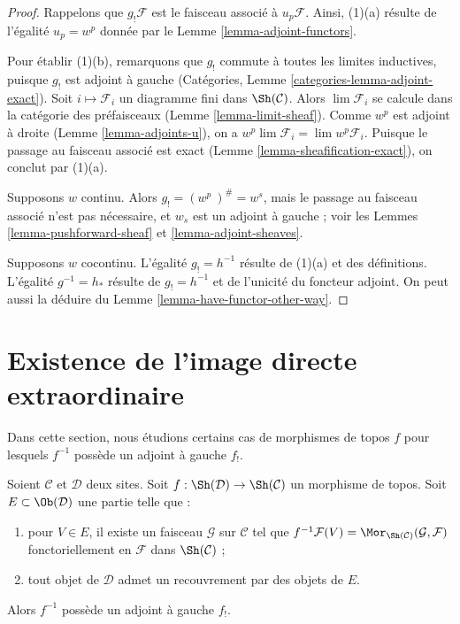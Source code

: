 \begin{proof}
Rappelons que $g_!\mathcal{F}$ est le faisceau associé à $u_p\mathcal{F}$.
Ainsi, (1)(a) résulte de l’égalité $u_p = w^p$ donnée par le
Lemme \ref{lemma-adjoint-functors}.

\medskip\noindent
Pour établir (1)(b), remarquons que $g_!$ commute à toutes les limites
inductives, puisque $g_!$ est adjoint à gauche (Catégories, Lemme
\ref{categories-lemma-adjoint-exact}).
Soit $i \mapsto \mathcal{F}_i$ un diagramme fini dans $\Sh(\mathcal{C})$.
Alors $\lim \mathcal{F}_i$ se calcule dans la catégorie des préfaisceaux
(Lemme \ref{lemma-limit-sheaf}). Comme $w^p$ est adjoint à droite
(Lemme \ref{lemma-adjoints-u}), on a
$w^p \lim \mathcal{F}_i = \lim w^p\mathcal{F}_i$.
Puisque le passage au faisceau associé est exact
(Lemme \ref{lemma-sheafification-exact}), on conclut par (1)(a).

\medskip\noindent
Supposons $w$ continu. Alors $g_! = (w^p\ )^\# = w^s$, mais le passage
au faisceau associé n’est pas nécessaire, et $w_s$ est un adjoint à gauche ;
voir les Lemmes \ref{lemma-pushforward-sheaf} et
\ref{lemma-adjoint-sheaves}.

\medskip\noindent
Supposons $w$ cocontinu. L’égalité $g_! = h^{-1}$ résulte de (1)(a)
et des définitions. L’égalité $g^{-1} = h_*$ résulte de
$g_! = h^{-1}$ et de l’unicité du foncteur adjoint.
On peut aussi la déduire du Lemme \ref{lemma-have-functor-other-way}.
\end{proof}









\section{Existence de l’image directe extraordinaire}
\label{section-lower-shriek}

\noindent
Dans cette section, nous étudions certains cas de morphismes de topos $f$
pour lesquels $f^{-1}$ possède un adjoint à gauche $f_!$.

\begin{lemma}
\label{lemma-existence-lower-shriek}
Soient $\mathcal{C}$ et $\mathcal{D}$ deux sites.
Soit $f : \Sh(\mathcal{D}) \to \Sh(\mathcal{C})$ un morphisme de topos.
Soit $E \subset \Ob(\mathcal{D})$ une partie telle que :
\begin{enumerate}
\item pour $V \in E$, il existe un faisceau $\mathcal{G}$ sur
$\mathcal{C}$ tel que $f^{-1}\mathcal{F}(V) =
\Mor_{\Sh(\mathcal{C})}(\mathcal{G}, \mathcal{F})$ fonctoriellement
en $\mathcal{F}$ dans $\Sh(\mathcal{C})$ ;
\item tout objet de $\mathcal{D}$ admet un recouvrement par des objets de $E$.
\end{enumerate}
Alors $f^{-1}$ possède un adjoint à gauche $f_!$.
\end{lemma}

